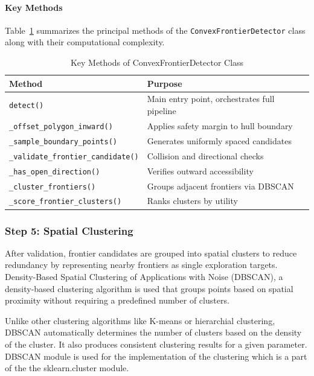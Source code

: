 \documentclass[11pt]{article}
\begin{document}
\paragraph{Key Methods}

Table~\ref{tab:detector_methods} summarizes the principal methods of the \texttt{ConvexFrontierDetector} class along with their computational complexity.

\begin{table}[h]
	\centering
	\caption{Key Methods of ConvexFrontierDetector Class}
	\label{tab:detector_methods}
	\begin{tabular}{@{}p{6cm}p{6.5cm}@{}}
		\toprule
		\textbf{Method} & \textbf{Purpose}\\ 
		\midrule
		\texttt{detect()} & Main entry point, orchestrates full pipeline\\
		\texttt{\_offset\_polygon\_inward()} & Applies safety margin to hull boundary\\
		\texttt{\_sample\_boundary\_points()} & Generates uniformly spaced candidates\\
		\texttt{\_validate\_frontier\_candidate()} & Collision and directional checks\\
		\texttt{\_has\_open\_direction()} & Verifies outward accessibility\\
		\texttt{\_cluster\_frontiers()} & Groups adjacent frontiers via DBSCAN\\
		\texttt{\_score\_frontier\_clusters()} & Ranks clusters by utility\\
		\bottomrule
	\end{tabular}
\end{table}

\subsubsection{Step 5: Spatial Clustering}

After validation, frontier candidates are grouped into spatial clusters to reduce redundancy by representing nearby frontiers as single exploration targets. Density-Based Spatial Clustering of Applications with Noise (DBSCAN), a density-based clustering algorithm is used that groups points based on spatial proximity without requiring a predefined number of clusters.

Unlike other clustering algorithms like K-means or hierarchial clustering, DBSCAN automatically determines the number of clusters based on the density of the cluster. It also produces consistent clustering results for a given parameter. DBSCAN module is used for the implementation of the clustering which is a part of the the sklearn.cluster module. 
\end{document}
